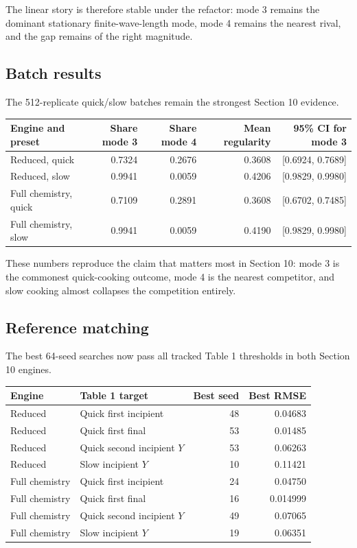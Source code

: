\documentclass[11pt]{article}
\begin{document}
The linear story is therefore stable under the refactor: mode 3 remains the dominant stationary finite-wave-length mode, mode 4 remains the nearest rival, and the gap remains of the right magnitude.

\subsection*{Batch results}
The 512-replicate quick/slow batches remain the strongest Section 10 evidence.

\begin{center}
\begin{tabular}{lrrrr}
\toprule
Engine and preset & Share mode 3 & Share mode 4 & Mean regularity & 95\% CI for mode 3 \\
\midrule
Reduced, quick & 0.7324 & 0.2676 & 0.3608 & [0.6924, 0.7689] \\
Reduced, slow & 0.9941 & 0.0059 & 0.4206 & [0.9829, 0.9980] \\
Full chemistry, quick & 0.7109 & 0.2891 & 0.3608 & [0.6702, 0.7485] \\
Full chemistry, slow & 0.9941 & 0.0059 & 0.4190 & [0.9829, 0.9980] \\
\bottomrule
\end{tabular}
\end{center}

These numbers reproduce the claim that matters most in Section 10: mode 3 is the commonest quick-cooking outcome, mode 4 is the nearest competitor, and slow cooking almost collapses the competition entirely.

\subsection*{Reference matching}
The best 64-seed searches now pass all tracked Table 1 thresholds in both Section 10 engines.

\begin{center}
\begin{tabular}{llrr}
\toprule
Engine & Table 1 target & Best seed & Best RMSE \\
\midrule
Reduced & Quick first incipient & 48 & 0.04683 \\
Reduced & Quick first final & 53 & 0.01485 \\
Reduced & Quick second incipient \(Y\) & 53 & 0.06263 \\
Reduced & Slow incipient \(Y\) & 10 & 0.11421 \\
Full chemistry & Quick first incipient & 24 & 0.04750 \\
Full chemistry & Quick first final & 16 & 0.014999 \\
Full chemistry & Quick second incipient \(Y\) & 49 & 0.07065 \\
Full chemistry & Slow incipient \(Y\) & 19 & 0.06351 \\
\bottomrule
\end{tabular}
\end{center}
\end{document}

